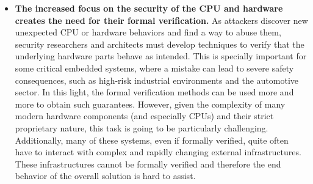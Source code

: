 \begin{itemize}
		\item \textbf{The increased focus on the security of the CPU and hardware creates the need for their formal verification.} As attackers discover new unexpected CPU or hardware behaviors and find a way to abuse them, security researchers and architects must develop techniques to verify that the underlying hardware parts behave as intended. This is specially important for some critical embedded systems, where a mistake can lead to severe safety consequences, such as high-risk industrial environments and the automotive sector. In this light, the formal verification methods can be used more and more to obtain such guarantees. However, given the complexity of many modern hardware components (and especially CPUs) and their strict proprietary nature, this task is going to be particularly challenging. Additionally, many of these systems, even if formally verified, quite often have to interact with complex and rapidly changing external infrastructures. These infrastructures cannot be formally verified and therefore the end behavior of the overall solution is hard to assist.  	
		\end{itemize}
		
		
